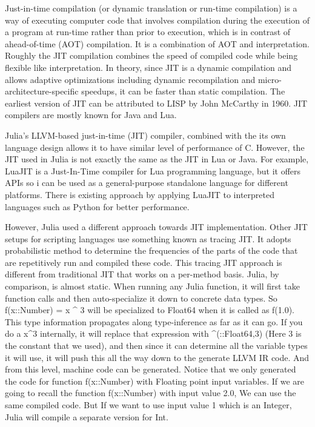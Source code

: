 \documentclass[11pt]{article}
\begin{document}
Just-in-time compilation (or dynamic translation or run-time compilation) is a way of executing computer code that involves compilation during the execution of a program at run-time rather than prior to execution, which is in contrast of ahead-of-time (AOT) compilation. \cite{Bezanson:2018:JDP:3288538.3276490} It is a combination of AOT and interpretation. Roughly the JIT compilation combines the speed of compiled code while being flexible like interpretation. In theory, since JIT is a dynamic compilation and allows adaptive optimizations including dynamic recompilation and micro-architecture-specific speedups, it can be faster than static compilation. The earliest version of JIT can be attributed to LISP by John McCarthy in 1960. JIT compilers are mostly known for Java and Lua.

Julia's LLVM-based just-in-time (JIT) compiler, combined with the its own language design allows it to have similar level of performance of C. However, the JIT used in Julia is not exactly the same as the JIT in Lua or Java. For example, LuaJIT is a Just-In-Time compiler for Lua programming language, but it offers APIs so i can be used as a general-purpose standalone language for different platforms. There is existing approach by applying LuaJIT to interpreted languages such as Python for better performance.  

However, Julia used a different approach towards JIT implementation. Other JIT setups for scripting languages use something known as tracing JIT. It adopts probabilistic method to determine the frequencies of the parts of the code that are repetitively run and compiled these code. This tracing JIT approach is different from traditional JIT that works on a per-method basis. Julia, by comparison, is almost static. When running any Julia function, it will first take function calls and then auto-specialize it down to concrete data types. So f(x::Number) = x \^{} 3 will be specialized to Float64 when it is called as f(1.0). This type information propagates along type-inference as far as it can go. If you do a x\^{}3 internally, it will replace that expression with \^{}(::Float64,3) (Here 3 is the constant that we used), and then since it can determine all the variable types it will use, it will push this all the way down to the generate LLVM IR code. And from this level, machine code can be generated. Notice that we only generated the code for function f(x::Number) with Floating point input variables. If we are going to recall the function f(x::Number) with input value 2.0, We can use the same compiled code. But If we want to use input value 1 which is an Integer, Julia will compile a separate version for Int.
\end{document}
